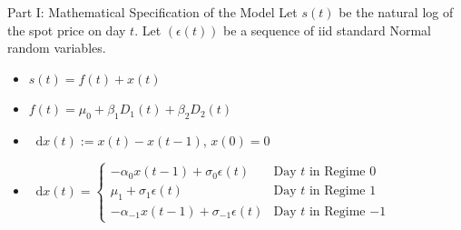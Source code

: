 \documentclass{beamer}
\newcommand*\dif{\mathop{}\!\mathrm{d}}
\begin{document}
\begin{frame}{Part I: Mathematical Specification of the Model}
    Let $s(t)$ be the natural log of the spot price on day $t$. Let $(\epsilon(t))$ be a sequence of iid standard Normal random variables.
    \\
    \begin{itemize}
        \setlength\itemsep{1em}
        \item $s(t) = f(t) + x(t)$
        \item $f(t) = \mu_0 + \beta_1 D_1(t) + \beta_2 D_2(t)$
        \item $\dif x(t) := x(t) - x(t-1)$, $x(0)=0$
        \item $ \dif x(t) = \begin{cases}
        -\alpha_0 x(t-1) + \sigma_0 \epsilon(t) & \text{Day $t$ in Regime $0$} \\
        \mu_1 + \sigma_1 \epsilon(t) & \text{Day $t$ in Regime $1$} \\
        -\alpha_{-1} x(t-1) + \sigma_{-1} \epsilon(t) & \text{Day $t$ in Regime $-1$} \end{cases} $
    \end{itemize}
\end{frame}




\end{document}
